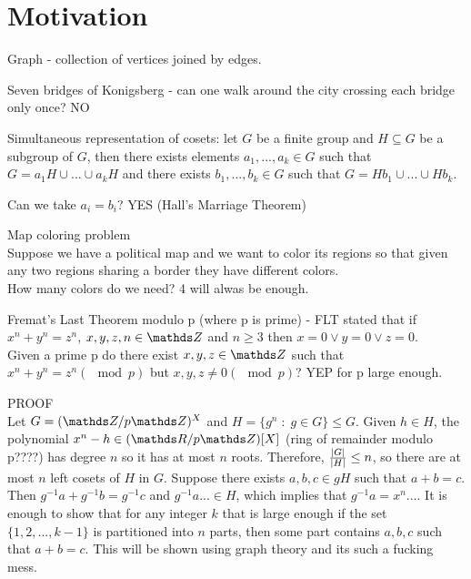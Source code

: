 \section{Motivation}

\begin{multicols*}{2}
   
    {\color{def}Graph} - collection of vertices joined by edges.
    \medskip

    {\color{acc}Seven bridges of Konigsberg} - can one walk around the city crossing each bridge only once? NO


    {\color{def}Simultaneous representation of cosets}: let $G$ be a finite group and $H\subseteq G$ be a subgroup of $G$, then there exists elements $a_1, ..., a_k\in G$ such that $G=a_1H\cup ...\cup a_kH$ and there exists $b_1, ..., b_k\in G$ such that $G=Hb_1\cup...\cup Hb_k$.\smallskip

    Can we take $a_i=b_i$? YES (Hall's Marriage Theorem)
    \bigskip

    {\color{def}Map coloring problem}\\
    Suppose we have a political map and we want to color its regions so that given any two regions sharing a border they have different colors.\\
    How many colors do we need? 4 will alwas be enough.
    \bigskip

    Fremat's Last Theorem modulo p (where p is prime) - FLT stated that if $x^n+y^n=z^n$, $x,y,z,n\in\Z$ and $n\geq 3$ then $x=0\lor y=0\lor z=0$.\\
    Given a prime p do there exist $x,y,z\in\Z$ such that $x^n+y^n=z^n(\mod p)$ but $x,y,z\neq 0 (\mod p)$? YEP for p large enough.
    \medskip

    PROOF\\
    Let $G=(\Z/p\Z)^X$ and $H=\{g^n\;:\;g\in G\}\leq G$. Given $h\in H$, the polynomial $x^n-h\in (\R/p\Z)[X]$ ({\color{cyan}ring of remainder modulo p????}) has degree $n$ so it has at most $n$ roots. Therefore, ${|G|\over |H|}\leq n$, so there are at most $n$ left cosets of $H$ in $G$. Suppose there exists $a,b,c\in gH$ such that $a+b=c$. Then $g^{-1}a+g^{-1}b=g^{-1}c$ and $g^{-1}a...\in H$, which implies that $g^{-1}a=x^n...$. It is enough to show that for any integer $k$ that is large enough if the set $\{1, 2, ..., k-1\}$ is partitioned into $n$ parts, then some part contains $a,b,c$ such that $a+b=c$. This will be shown using graph theory and its such a fucking mess.

\end{multicols*}